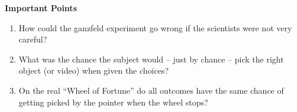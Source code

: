 \begin{center}
  {\large\bf Important Points}
\end{center}
\begin{enumerate}
\item How could the ganzfeld experiment go wrong if the scientists
  were not very careful? \vfill

\item What was the chance the subject would -- just by chance --  pick
  the right object (or video) when given the choices?\vfill 

\item On the real ``Wheel of Fortune'' do all outcomes have the same
  chance of getting picked by the pointer when the wheel stops?
\end{enumerate}


